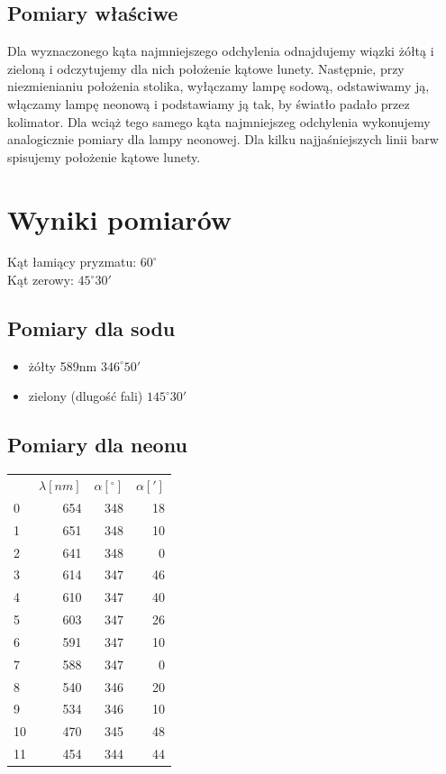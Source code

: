 \documentclass[a4paper,10pt]{article}
\begin{document}
\subsection{Pomiary właściwe}
Dla wyznaczonego kąta najmniejszego odchylenia odnajdujemy wiązki żółtą i zieloną i odczytujemy dla nich położenie kątowe lunety. Następnie, przy niezmienianiu położenia stolika, wyłączamy lampę sodową, odstawiwamy ją, włączamy lampę neonową i podstawiamy ją tak, by światło padało przez kolimator. Dla wciąż tego samego kąta najmniejszeg odchylenia wykonujemy analogicznie pomiary dla lampy neonowej. Dla kilku najjaśniejszych linii barw spisujemy położenie kątowe lunety.

\section{Wyniki pomiarów}
Kąt łamiący pryzmatu: $60^\circ$
\\Kąt zerowy: $45^\circ 30'$
\subsection{Pomiary dla sodu}
\begin{itemize}
  \item żółty 589nm $346^\circ 50'$ %
  \item zielony (dlugość fali) $145^\circ 30'$ %
\end{itemize}
\subsection{Pomiary dla neonu}
\begin{tabular}{lrrr}
{} &  $\lambda[nm]$ &  $\alpha[^\circ]$ &  $\alpha[']$ \\
0  &         654 &          348 &          18 \\
1  &         651 &          348 &          10 \\
2  &         641 &          348 &           0 \\
3  &         614 &          347 &          46 \\
4  &         610 &          347 &          40 \\
5  &         603 &          347 &          26 \\
6  &         591 &          347 &          10 \\
7  &         588 &          347 &           0 \\
8  &         540 &          346 &          20 \\
9  &         534 &          346 &          10 \\
10 &         470 &          345 &          48 \\
11 &         454 &          344 &          44 \\
\end{tabular}
\end{document}
